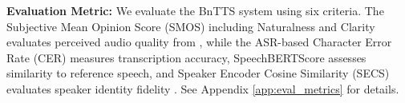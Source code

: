 

\noindent \textbf{Evaluation Metric: } We evaluate the BnTTS system using six criteria. The Subjective Mean Opinion Score (SMOS) including Naturalness and Clarity evaluates perceived audio quality from \citet{streijl2016mean}, while the ASR-based Character Error Rate (CER) \cite{nandi-etal-2023-pseudo} measures transcription accuracy, SpeechBERTScore assesses similarity to reference speech, and Speaker Encoder Cosine Similarity (SECS) evaluates speaker identity fidelity \cite{saeki2024spbertscore, casanova2021sc, thienpondt2024ecapa2}. See Appendix \ref{app:eval_metrics} for details.
